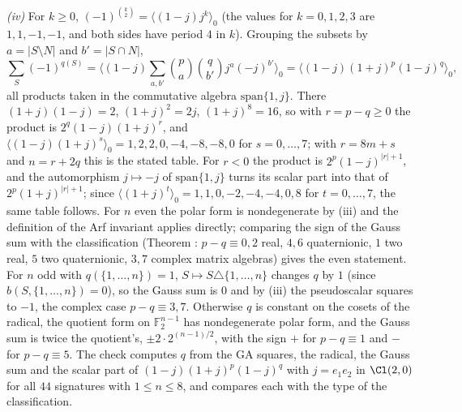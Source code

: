 \emph{(iv)} For $k \ge 0$, $(-1)^{\binom{k}{2}} = \langle (1 - j)j^{k}\rangle_{0}$ (the values for $k = 0, 1, 2, 3$ are $1, 1, -1, -1$, and both sides have period $4$ in $k$). Grouping the subsets by $a = |S \setminus N|$ and $b' = |S \cap N|$,
\[
\sum_{S}(-1)^{q(S)} = \Big\langle (1 - j)\sum_{a, b'}\binom{p}{a}\binom{q}{b'}j^{a}(-j)^{b'}\Big\rangle_{0} = \big\langle (1 - j)(1 + j)^{p}(1 - j)^{q}\big\rangle_{0},
\]
all products taken in the commutative algebra $\mathrm{span}\{1, j\}$. There $(1 + j)(1 - j) = 2$, $(1 + j)^{2} = 2j$, $(1 + j)^{8} = 16$, so with $r = p - q \ge 0$ the product is $2^{q}(1 - j)(1 + j)^{r}$, and $\langle (1 - j)(1 + j)^{s}\rangle_{0} = 1, 2, 2, 0, -4, -8, -8, 0$ for $s = 0, \dots, 7$; with $r = 8m + s$ and $n = r + 2q$ this is the stated table. For $r < 0$ the product is $2^{p}(1 - j)^{|r| + 1}$, and the automorphism $j \mapsto -j$ of $\mathrm{span}\{1, j\}$ turns its scalar part into that of $2^{p}(1 + j)^{|r| + 1}$; since $\langle (1 + j)^{t}\rangle_{0} = 1, 1, 0, -2, -4, -4, 0, 8$ for $t = 0, \dots, 7$, the same table follows. For $n$ even the polar form is nondegenerate by (iii) and the definition of the Arf invariant applies directly; comparing the sign of the Gauss sum with the classification (Theorem : $p - q \equiv 0, 2$ real, $4, 6$ quaternionic, $1$ two real, $5$ two quaternionic, $3, 7$ complex matrix algebras) gives the even statement. For $n$ odd with $q(\{1, \dots, n\}) = 1$, $S \mapsto S \triangle \{1, \dots, n\}$ changes $q$ by $1$ (since $b(S, \{1, \dots, n\}) = 0$), so the Gauss sum is $0$ and by (iii) the pseudoscalar squares to $-1$, the complex case $p - q \equiv 3, 7$. Otherwise $q$ is constant on the cosets of the radical, the quotient form on $\mathbb{F}_{2}^{n-1}$ has nondegenerate polar form, and the Gauss sum is twice the quotient's, $\pm 2 \cdot 2^{(n-1)/2}$, with the sign $+$ for $p - q \equiv 1$ and $-$ for $p - q \equiv 5$. The check computes $q$ from the GA squares, the radical, the Gauss sum and the scalar part of $(1 - j)(1 + j)^{p}(1 - j)^{q}$ with $j = e_{1}e_{2}$ in $\Cl(2,0)$ for all $44$ signatures with $1 \le n \le 8$, and compares each with the type of the classification.

